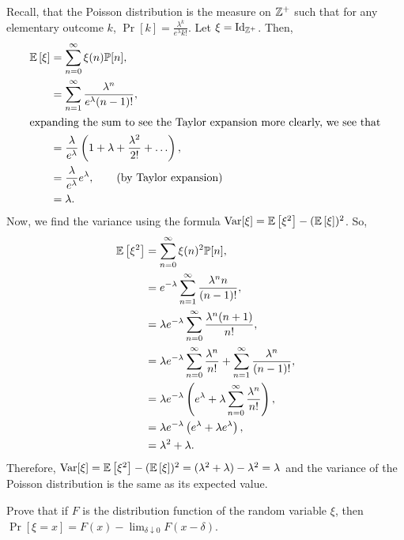 \begin{solution}
    Recall, that the Poisson distribution is the measure on $\mathbb{Z}^+$ such that for
    any elementary outcome $k$, $\Pr\left[{k}\right] =
    \frac{\lambda^k}{e^\lambda k!}$. Let $\xi = \operatorname{Id}_{\mathbb{Z}^+}$. Then, 
    \begin{align*}
        \mathbb{E}\left[\xi\right] &= \sum_{n=0}^\infty \xi(n)\mathbb{P}[{n}], \\
        &= \sum_{n=1}^\infty \frac{\lambda^n}{e^\lambda (n-1)!}, \\
        \intertext{expanding the sum to see the Taylor expansion more clearly, we see that}
        &= \frac{\lambda}{e^\lambda}\left(1 + \lambda + \frac{\lambda^2}{2!} + \ldots \right), \\
        &= \frac{\lambda}{e^\lambda}e^\lambda, \tag{by Taylor expansion} \\
        &= \lambda.
    \end{align*}
    Now, we find the variance using the formula $\operatorname{Var}[\xi] = \mathbb{E}\left[\xi^2\right] - (\mathbb{E}\left[\xi\right])^2$. So,
    \begin{align*}
        \mathbb{E}\left[\xi^2\right] &= \sum_{n=0}^\infty \xi(n)^2\mathbb{P}[n], \\
        &= e^{-\lambda}\sum_{n=1}^\infty \frac{\lambda^n n}{(n-1)!}, \\
        &= \lambda e^{-\lambda} \sum_{n=0}^\infty \frac{\lambda^n (n+1)}{n!}, \\
        &= \lambda e^{-\lambda} \sum_{n=0}^\infty \frac{\lambda^n}{n!} + \sum_{n=1}^\infty \frac{\lambda^n}{(n-1)!}, \\
        &= \lambda e^{-\lambda} \left(e^\lambda + \lambda \sum_{n=0}^\infty \frac{\lambda^n}{n!}\right), \\
        &= \lambda e^{-\lambda} \left(e^\lambda + \lambda e^\lambda\right), \\
        &= \lambda^2 + \lambda.
    \end{align*}
    Therefore, $\operatorname{Var}[\xi] = \mathbb{E}\left[\xi^2\right] - (\mathbb{E}\left[\xi\right])^2 = (\lambda^2 + \lambda) - \lambda^2 = \lambda$ and the variance of the Poisson distribution is the same as its expected value.
\end{solution}
\begin{problem}{9}
    Prove that if $F$ is the distribution function of the random variable $\xi$, then $\Pr[\xi = x] = F(x) - \lim_{\delta \downarrow 0} F(x-\delta)$.
\end{problem}
